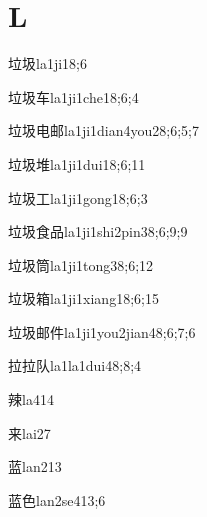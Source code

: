 \section*{L}

\begin{verbete}{垃圾}{la1ji1}{8;6}
\end{verbete}
\begin{verbete}{垃圾车}{la1ji1che1}{8;6;4}
\end{verbete}
\begin{verbete}{垃圾电邮}{la1ji1dian4you2}{8;6;5;7}
\end{verbete}
\begin{verbete}{垃圾堆}{la1ji1dui1}{8;6;11}
\end{verbete}
\begin{verbete}{垃圾工}{la1ji1gong1}{8;6;3}
\end{verbete}
\begin{verbete}{垃圾食品}{la1ji1shi2pin3}{8;6;9;9}
\end{verbete}
\begin{verbete}{垃圾筒}{la1ji1tong3}{8;6;12}
\end{verbete}
\begin{verbete}{垃圾箱}{la1ji1xiang1}{8;6;15}
\end{verbete}
\begin{verbete}{垃圾邮件}{la1ji1you2jian4}{8;6;7;6}
\end{verbete}
\begin{verbete}{拉拉队}{la1la1dui4}{8;8;4}
\end{verbete}
\begin{verbete}{辣}{la4}{14}
\end{verbete}
\begin{verbete}{来}{lai2}{7}
\end{verbete}
\begin{verbete}{蓝}{lan2}{13}
\end{verbete}
\begin{verbete}{蓝色}{lan2se4}{13;6}
\end{verbete}
